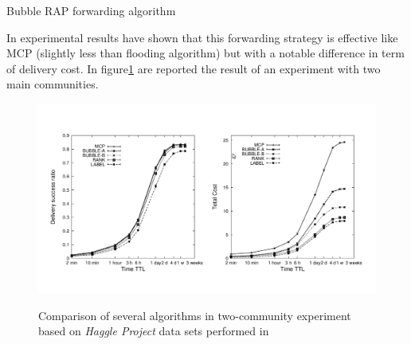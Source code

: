 \begin{algorithm}
\caption{Bubble RAP forwarding algorithm}
\label{r_bubble_alg}
\begin{algorithmic}
 		\ENDIF 
 \ELSE
 		\ENDIF 
 \ENDIF
 \ENDFOR
\end{algorithmic}
\end{algorithm}

In \cite{bubble} experimental results have shown that this forwarding strategy is effective like MCP (slightly less than flooding algorithm) but with a notable difference in term of delivery cost. In figure\ref{fig:bubblerap-performance} are reported the result of an experiment with two main communities.

\begin{figure}[h!]
	\begin{center}
    \label{fig:bubblerap-performance}
    \includegraphics[scale=0.35]{img/bubblerap-performance.png}
    \caption{Comparison of several algorithms in two-community experiment based on \emph{Haggle Project} data sets performed in\cite{bubble}}
  \end{center}
\end{figure}
